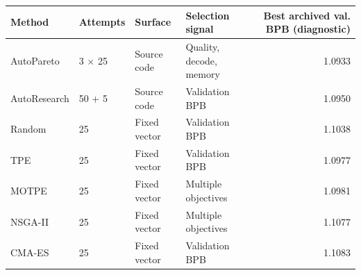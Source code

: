 \begin{tabular}{lp{.5in}p{.62in}p{1.05in}r}
\toprule
Method & Attempts & Surface & Selection signal & Best archived val. BPB (diagnostic) \\
\midrule
AutoPareto & 3 $\times$ 25 & Source code & Quality, decode, memory & 1.0933 \\
AutoResearch & 50 + 5 & Source code & Validation BPB & 1.0950 \\
Random & 25 & Fixed vector & Validation BPB & 1.1038 \\
TPE & 25 & Fixed vector & Validation BPB & 1.0977 \\
MOTPE & 25 & Fixed vector & Multiple objectives & 1.0981 \\
NSGA-II & 25 & Fixed vector & Multiple objectives & 1.1077 \\
CMA-ES & 25 & Fixed vector & Validation BPB & 1.1083 \\
\bottomrule
\end{tabular}
